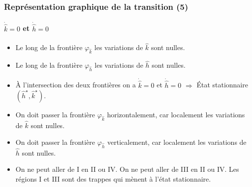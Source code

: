 \documentclass[10pt,notheorems]{beamer}
\theoremstyle{plain}
\theoremstyle{definition} %
\begin{document}
\begin{frame}
  \frametitle{Représentation graphique de la transition (5)}
  \framesubtitle{$\dot{\hat k}=0$ et $\dot{\hat h}=0$}
  \begin{itemize}

  \item Le long de la frontière $\varphi_{\hat k}$ les variations de $\hat k$ sont nulles.\newline

  \item Le long de la frontière $\varphi_{\hat h}$ les variations de $\hat h$ sont nulles.\newline

  \item À l'intersection des deux frontières on a $\dot{\hat k}=0$ et $\dot{\hat h}=0$ $\Rightarrow$ État stationnaire $(\hat h^\star, \hat k^\star)$.\newline

  \item On doit passer la frontière $\varphi_{\hat k}$ horizontalement, car localement les variations de $\hat k$ sont nulles.\newline

  \item On doit passer la frontière $\varphi_{\hat h}$ verticalement, car localement les variations de $\hat h$ sont nulles.\newline

  \item On ne peut aller de I en II ou IV. On ne peut aller de III en II ou IV. Les régions I et III sont des trappes qui mènent à l'état stationnaire.

  \end{itemize}

\end{frame}
\end{document}
